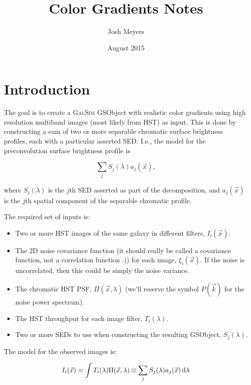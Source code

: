 \documentclass{article}
\title{Color Gradients Notes}
\author{Josh Meyers}
\date{August 2015}
\begin{document}
\section{Introduction}

The goal is to create a \textsc{GalSim} GSObject with realistic color gradients using high
resolution multiband images (most likely from HST) as input.  This is done by constructing a sum of
two or more separable chromatic surface brightness profiles, each with a particular asserted SED.
I.e., the model for the preconvolution surface brightness profile is

\begin{equation}
    \sum_j S_j(\lambda) a_j(\vec{x}),
\end{equation}

where $S_j(\lambda)$ is the $j$th SED asserted as part of the decomposition, and $a_j(\vec{x})$ is
the $j$th spatial component of the separable chromatic profile.

The required set of inputs is:

\begin{itemize}

\item Two or more HST images of the same galaxy in different filters, $I_i(\vec{x})$.

\item The 2D noise covariance function (it should really be called a covariance function, not a
correlation function :)) for each image, $\xi_i(\vec{x})$.  If the noise is uncorrelated, then this
could be simply the noise variance.

\item The chromatic HST PSF, $\Pi(\vec{x}, \lambda)$ (we'll reserve the symbol $P(\vec{k})$ for the
noise power spectrum).

\item The HST throughput for each image filter, $T_i(\lambda)$.

\item Two or more SEDs to use when constructing the resulting GSObject, $S_j(\lambda)$.

\end{itemize}

The model for the observed images is:

\begin{equation}
  I_i(\vec{x}) = \int T_i(\lambda) \Pi(\vec{x}, \lambda) \otimes \sum_j S_j(\lambda) a_j(\vec{x}) \dif{\lambda}
\end{equation}
\end{document}
